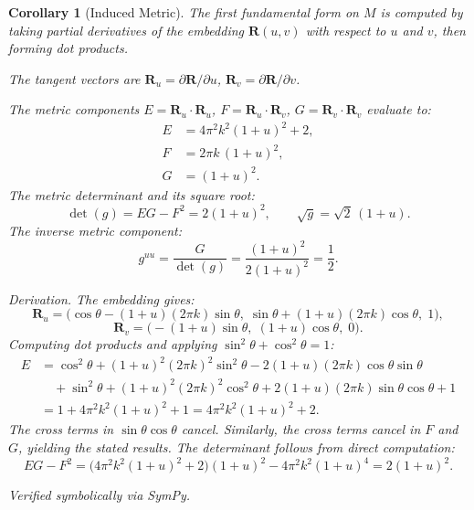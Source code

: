 \documentclass[12pt]{amsart}
\newtheorem{corollary}{Corollary}
\begin{document}
\begin{corollary}[Induced Metric]
The first fundamental form on $M$ is computed by taking partial derivatives of the embedding
$\mathbf{R}(u,v)$ with respect to $u$ and $v$, then forming dot products.

The tangent vectors are $\mathbf{R}_u = \partial\mathbf{R}/\partial u$,
$\mathbf{R}_v = \partial\mathbf{R}/\partial v$.

The metric components $E = \mathbf{R}_u \cdot \mathbf{R}_u$,
$F = \mathbf{R}_u \cdot \mathbf{R}_v$,
$G = \mathbf{R}_v \cdot \mathbf{R}_v$ evaluate to:
\begin{align}
  E &= 4\pi^2 k^2 (1+u)^2 + 2, \label{eq:E} \\
  F &= 2\pi k\, (1+u)^2, \label{eq:F} \\
  G &= (1+u)^2. \label{eq:G}
\end{align}
The metric determinant and its square root:
\[
  \det(g) = EG - F^2 = 2(1+u)^2, \qquad \sqrt{g} = \sqrt{2}\,(1+u).
\]
The inverse metric component:
\[
  g^{uu} = \frac{G}{\det(g)} = \frac{(1+u)^2}{2(1+u)^2} = \frac{1}{2}.
\]

\textit{Derivation.} The embedding gives:
\[
  \mathbf{R}_u = \bigl(\cos\theta - (1+u)(2\pi k)\sin\theta,\;
    \sin\theta + (1+u)(2\pi k)\cos\theta,\; 1\bigr),
\]
\[
  \mathbf{R}_v = \bigl(-(1+u)\sin\theta,\; (1+u)\cos\theta,\; 0\bigr).
\]
Computing dot products and applying $\sin^2\theta + \cos^2\theta = 1$:
\begin{align*}
  E &= \cos^2\theta + (1+u)^2(2\pi k)^2\sin^2\theta
       - 2(1+u)(2\pi k)\cos\theta\sin\theta \\
    &\quad + \sin^2\theta + (1+u)^2(2\pi k)^2\cos^2\theta
       + 2(1+u)(2\pi k)\sin\theta\cos\theta + 1 \\
    &= 1 + 4\pi^2 k^2(1+u)^2 + 1 = 4\pi^2 k^2(1+u)^2 + 2.
\end{align*}
The cross terms in $\sin\theta\cos\theta$ cancel. Similarly, the cross terms cancel in $F$
and $G$, yielding the stated results. The determinant follows from direct computation:
\[
  EG - F^2 = \bigl(4\pi^2 k^2(1+u)^2 + 2\bigr)(1+u)^2 - 4\pi^2 k^2(1+u)^4 = 2(1+u)^2.
\]

Verified symbolically via SymPy.
\end{corollary}
\end{document}
